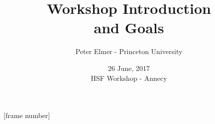 \documentclass{beamer}
\title{Workshop Introduction\\
       and Goals}
\author{Peter Elmer - Princeton University}
\date{26 June, 2017 \\ HSF Workshop - Annecy}
\begin{document}
\maketitle

%
%

[frame number]


%



%

%
%
%
%

%



\end{document}
